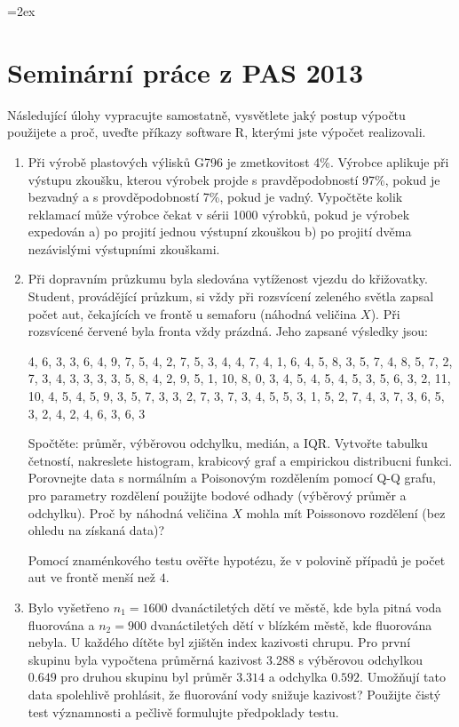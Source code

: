 \documentclass[a4paper,12pt]{article}
\begin{document}
\parskip=2ex
\parindent=0pt
\pagestyle{empty}
 \section*{Seminární práce z PAS 2013}

 Následující úlohy vypracujte samostatně, vysvětlete jaký postup výpočtu použijete a proč, uveďte příkazy software R, kterými jste výpočet realizovali.


 \begin{enumerate}
  \item Při výrobě plastových výlisků G796 je zmetkovitost 4\%. Výrobce aplikuje při výstupu zkoušku, kterou výrobek projde s pravděpodobností 97\%,
  pokud je bezvadný a s provděpodobností 7\%, pokud je vadný.
  Vypočtěte kolik reklamací může výrobce čekat v sérii 1000 výrobků, pokud je výrobek expedován 
  a) po projití jednou výstupní zkouškou b) po projití dvěma nezávislými výstupními zkouškami.

  \item Při dopravním průzkumu byla sledována vytíženost vjezdu do křižovatky.
  Student, provádějící průzkum, si vždy při rozsvícení zeleného světla zapsal počet aut, čekajících 
  ve frontě u semaforu (náhodná veličina $X$). Při rozsvícené červené byla fronta vždy prázdná. Jeho zapsané výsledky jsou:

4, 6, 3, 3, 6, 4, 9, 7, 5, 4, 2, 7, 5, 3, 4, 4, 7, 4, 1, 6, 4, 5, 8, 3, 5,
7, 4, 8, 5, 7, 2, 7, 3, 4, 3, 3, 3, 3, 5, 8, 4, 2, 9, 5, 1, 10, 8, 0, 3, 4,
5, 4, 5, 4, 5, 3, 5, 6, 3, 2, 11, 10, 4, 5, 4, 5, 9, 3, 5, 7, 3, 3, 2, 7, 3,
7, 3, 4, 5, 5, 3, 1, 5, 2, 7, 4, 3, 7, 3, 6, 5, 3, 2, 4, 2, 4, 6, 3, 6, 3


  Spočtěte: průměr, výběrovou odchylku, medián, a IQR. Vytvořte tabulku četností, nakreslete histogram, krabicový graf a empirickou distribucni funkci. 
  Porovnejte data s normálním a Poisonovým rozdělením pomocí Q-Q grafu, 
  pro parametry rozdělení použijte bodové odhady (výběrový průměr a odchylku). Proč by náhodná veličina $X$ mohla mít Poissonovo rozdělení (bez ohledu na získaná data)?
  
  Pomocí znaménkového testu ověřte hypotézu, že v polovině případů je počet aut ve frontě menší než $4$.

  \item Bylo vyšetřeno $n_1 = 1600$ dvanáctiletých dětí ve městě, kde byla pitná voda fluorována
 a $n_2 = 900$ dvanáctiletých dětí v blízkém městě, kde fluorována nebyla.
U každého dítěte byl zjištěn index kazivosti chrupu. 
Pro první skupinu byla vypočtena průměrná kazivost $3.288$ s výběrovou odchylkou $0.649$ pro 
druhou skupinu byl průměr $3.314$ a odchylka $0.592$. Umožňují tato data spolehlivě prohlásit, že 
fluorování vody snižuje kazivost? Použijte čistý test významnosti a pečlivě formulujte předpoklady testu.


\end{enumerate}
\end{document}
